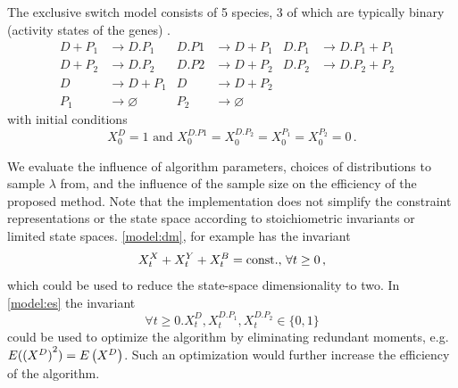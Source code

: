 
\begin{model}\label{model:es}
	The exclusive switch model consists of \num{5} species, \num{3} of which are typically binary (activity states of the genes) \parencite{loinger2007stochastic}.
\begin{align*}
	D + P_1 &\xrightarrow{} D.P_1 &
	D.P1 &\xrightarrow{} D + P_1  &
	D.P_1 &\xrightarrow{} D.P_1 + P_1 \\
	D + P_2 &\xrightarrow{} D.P_2& 
	D.P2 &\xrightarrow{} D + P_2 &
	D.P_2 &\xrightarrow{} D.P_2 + P_2\\
	D &\xrightarrow{} D + P_1&
	D &\xrightarrow{} D + P_2& & &\\
	P_1 &\xrightarrow{}\varnothing & P_2 & \xrightarrow{} \varnothing
\end{align*}
with initial conditions 
	\[X^D_0=1 \text{ and } X^{D.P1}_0=X^{D.{P_2}}_0=X^{P_1}_0=X^{P_2}_0=0\,.\]
\end{model}

We evaluate the influence of algorithm parameters, choices of distributions
to sample $\lambda$ from, and the influence of the sample size on the efficiency of
the proposed method.
Note that the implementation does not simplify the constraint representations
or the state space according to stoichiometric invariants or limited
state spaces.
\autoref{model:dm}, for example has the invariant 
\[
	X^X_t+X^Y_t+X^B_t=\text{const.}$, $\forall t\geq 0\,,
\]
which could be used to reduce the state-space dimensionality to two.
In \autoref{model:es} the invariant 
\[
	\forall t\geq 0.X^D_t,X^{D.{P_1}}_t,X^{D.{P_2}}_t\in\{0,1\}
\]
could be used to optimize the algorithm by eliminating redundant moments, e.g.\ ${E}({(X^D)}^2)={E}\left(X^D\right)$.
Such an optimization would further increase the efficiency of the algorithm.




